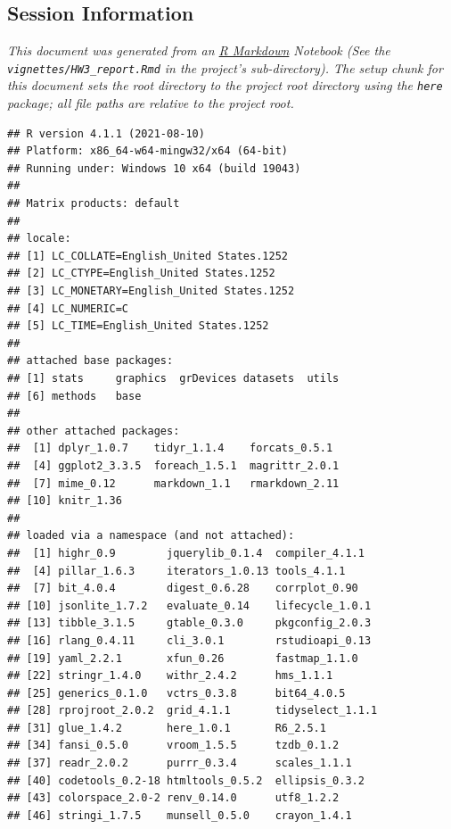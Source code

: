 \documentclass[
  11pt,
  a4paper,
]{scrartcl}
\begin{document}
\newpage

\hypertarget{session-information}{%
\subsection{Session Information}\label{session-information}}

\emph{This document was generated from an
\href{http://rmarkdown.rstudio.com}{R Markdown} Notebook (See the
\texttt{vignettes/HW3\_report.Rmd} in the project's sub-directory). The
setup chunk for this document sets the root directory to the project
root directory using the \texttt{here} package; all file paths are
relative to the project root.}

\begin{verbatim}
## R version 4.1.1 (2021-08-10)
## Platform: x86_64-w64-mingw32/x64 (64-bit)
## Running under: Windows 10 x64 (build 19043)
## 
## Matrix products: default
## 
## locale:
## [1] LC_COLLATE=English_United States.1252 
## [2] LC_CTYPE=English_United States.1252   
## [3] LC_MONETARY=English_United States.1252
## [4] LC_NUMERIC=C                          
## [5] LC_TIME=English_United States.1252    
## 
## attached base packages:
## [1] stats     graphics  grDevices datasets  utils    
## [6] methods   base     
## 
## other attached packages:
##  [1] dplyr_1.0.7    tidyr_1.1.4    forcats_0.5.1 
##  [4] ggplot2_3.3.5  foreach_1.5.1  magrittr_2.0.1
##  [7] mime_0.12      markdown_1.1   rmarkdown_2.11
## [10] knitr_1.36    
## 
## loaded via a namespace (and not attached):
##  [1] highr_0.9        jquerylib_0.1.4  compiler_4.1.1  
##  [4] pillar_1.6.3     iterators_1.0.13 tools_4.1.1     
##  [7] bit_4.0.4        digest_0.6.28    corrplot_0.90   
## [10] jsonlite_1.7.2   evaluate_0.14    lifecycle_1.0.1 
## [13] tibble_3.1.5     gtable_0.3.0     pkgconfig_2.0.3 
## [16] rlang_0.4.11     cli_3.0.1        rstudioapi_0.13 
## [19] yaml_2.2.1       xfun_0.26        fastmap_1.1.0   
## [22] stringr_1.4.0    withr_2.4.2      hms_1.1.1       
## [25] generics_0.1.0   vctrs_0.3.8      bit64_4.0.5     
## [28] rprojroot_2.0.2  grid_4.1.1       tidyselect_1.1.1
## [31] glue_1.4.2       here_1.0.1       R6_2.5.1        
## [34] fansi_0.5.0      vroom_1.5.5      tzdb_0.1.2      
## [37] readr_2.0.2      purrr_0.3.4      scales_1.1.1    
## [40] codetools_0.2-18 htmltools_0.5.2  ellipsis_0.3.2  
## [43] colorspace_2.0-2 renv_0.14.0      utf8_1.2.2      
## [46] stringi_1.7.5    munsell_0.5.0    crayon_1.4.1
\end{verbatim}
\end{document}
